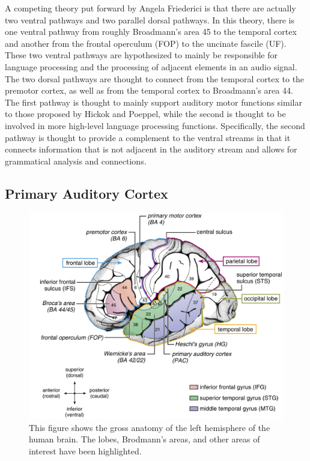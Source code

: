 \documentclass[titlepage]{article}
\begin{document}
  A competing theory
  put forward by Angela Friederici \cite{Friederici2011} is that there are actually two ventral pathways and
  two parallel dorsal pathways. In this theory, there is one ventral pathway from roughly Broadmann's area 45
  to the temporal cortex and another from the frontal operculum (FOP) to the uncinate fascile (UF).
  These two ventral pathways are hypothesized to mainly be responsible for language processing and the
  processing of adjacent elements in an audio signal. The two dorsal pathways are thought to connect from the
  temporal cortex to the premotor cortex, as well as from the temporal cortex to Broadmann's area 44. The first
  pathway is thought to mainly support auditory motor functions similar to those proposed by Hickok and Poeppel,
  while the second is thought to be involved in more high-level language processing functions. Specifically, the
  second pathway is thought to provide a complement to the ventral streams in that it connects information that
  is not adjacent in the auditory stream and allows for grammatical analysis and connections.

  \subsection{Primary Auditory Cortex} \label{primaryAuditoryCortex}

    \begin{figure}
      \centering
      \includegraphics[scale=0.25]{primaryAuditoryAnatomy}
      \caption{This figure shows the gross anatomy of the left hemisphere
      of the human brain. The lobes, Brodmann's areas, and other areas
      of interest have been highlighted. \cite{Friederici2011}}
      \label{primaryAuditoryAnatomy}
    \end{figure}
\end{document}
